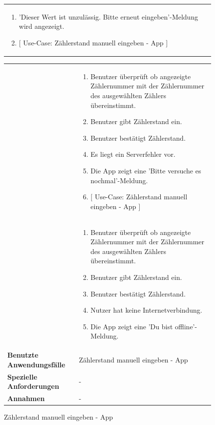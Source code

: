 \begin{figure}[h]
\begin{tabularx}{\textwidth}{ X | X }
\begin{enumerate}
			\item 'Dieser Wert ist unzulässig. Bitte erneut eingeben'-Meldung wird angezeigt. 
 			\item $\lbrack$ Use-Case: Zählerstand manuell eingeben - App $\rbrack$
		\end{enumerate} \\


	\end{tabularx}
\end{figure}

\begin{figure}[h]
	\centering
	\begin{tabularx}{\textwidth}{ X | X }
	&
		\begin{enumerate}
			\item Benutzer überprüft ob angezeigte Zählernummer mit der Zählernummer des ausgewählten Zählers übereinstimmt.
			\item Benutzer gibt Zählerstand ein.
			\item Benutzer bestätigt Zählerstand.
			\item Es liegt ein Serverfehler vor.
			\item Die App zeigt eine 'Bitte versuche es nochmal'-Meldung. 
			\item $\lbrack$ Use-Case: Zählerstand manuell eingeben - App $\rbrack$
		\end{enumerate} \\  &
		\begin{enumerate}
			\item Benutzer überprüft ob angezeigte Zählernummer mit der Zählernummer des ausgewählten Zählers übereinstimmt.
			\item Benutzer gibt Zählerstand ein.
			\item Benutzer bestätigt Zählerstand.
			\item Nutzer hat keine Internetverbindung.
			\item Die App zeigt eine 'Du bist offline'-Meldung.
		\end{enumerate}  \\ \hline
		\textbf{Benutzte Anwendungsfälle} & Zählerstand manuell eingeben - App \\ \hline
		\textbf{Spezielle Anforderungen} & - \\ \hline
		\textbf{Annahmen} & -
	\end{tabularx}
	\caption{Zählerstand manuell eingeben - App}
	\label{fig:anwendungsfall-server-tabelle-xx-1}
\end{figure}

